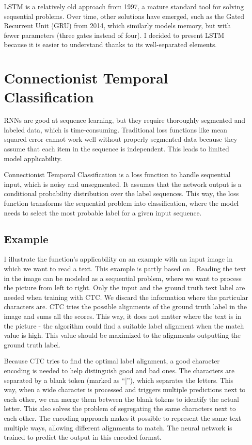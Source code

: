 LSTM is a relatively old approach from 1997, a mature standard tool for solving sequential problems. Over time, other solutions have emerged, such as the Gated Recurrent Unit\cite{GRU} (GRU) from 2014, which similarly models memory, but with fewer parameters (three gates instead of four). I decided to present LSTM because it is easier to understand thanks to its well-separated elements.

\section{Connectionist Temporal Classification}

RNNs are good at sequence learning, but they require thoroughly segmented and labeled data, which is time-consuming. Traditional loss functions like mean squared error cannot work well without properly segmented data because they assume that each item in the sequence is independent. This leads to limited model applicability.

Connectionist Temporal Classification\cite{CTC} is a loss function to handle sequential input, which is noisy and unsegmented. It assumes that the network output is a conditional probability distribution over the label sequences. This way, the loss function transforms the sequential problem into classification, where the model needs to select the most probable label for a given input sequence. 

\subsection{Example}

I illustrate the function's applicability on an example with an input image in which we want to read a text. This example is partly based on \cite{CTCexp}. Reading the text in the image can be modeled as a sequential problem, where we want to process the picture from left to right. Only the input and the ground truth text label are needed when training with CTC. We discard the information where the particular characters are. CTC tries the possible alignments of the ground truth label in the image and sums all the scores. This way, it does not matter where the text is in the picture - the algorithm could find a suitable label alignment when the match value is high. This value should be maximized to the alignments outputting the ground truth label.

Because CTC tries to find the optimal label alignment, a good character encoding is needed to help distinguish good and bad ones. The characters are separated by a blank token (marked as ``|''), which separates the letters. This way, when a wide character is processed and triggers multiple predictions next to each other, we can merge them between the blank tokens to identify the actual letter. This also solves the problem of segregating the same characters next to each other. The encoding approach makes it possible to represent the same text multiple ways, allowing different alignments to match. The neural network is trained to predict the output in this encoded format.

